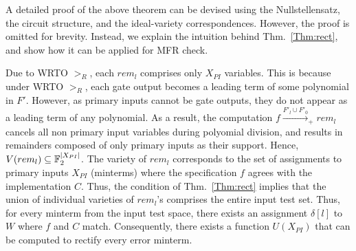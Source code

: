 
A detailed proof of the above theorem can be devised using the
Nullstellensatz, the circuit structure, and the 
ideal-variety correspondences. However, the proof is omitted for brevity. 
Instead, we explain the
intuition behind Thm.~\ref{Thm:rect}, and show how it can be applied
for MFR check.

Due to WRTO $>_R$, each $rem_l$ comprises only $X_{PI}$
variables. This is because under WRTO $>_R$, each gate output becomes
a leading term of some polynomial in $F'$. However, as primary inputs 
cannot be gate outputs, they do not appear as a leading term
of any polynomial. As a result, the computation
$f\xrightarrow{F'_l\cup F'_0}_+rem_l$ cancels all non primary input
variables during polyomial division, and results in remainders composed of 
only primary inputs as their support. Hence, $V(rem_l) \subseteq
{\mathbb{F}}_{2}^{|X_{PI}|}$. The variety of  $rem_l$  corresponds to the set of
assignments to primary inputs $X_{PI}$ (minterms) where the
specification $f$ agrees with the implementation $C$. Thus, the
condition of Thm.~\ref{Thm:rect} implies that the union of individual
varieties of $rem_l$'s comprises the entire input test set. Thus, for
every minterm from the input test space, there exists an assignment
$\delta[l]$ to $W$ where $f$ and $C$ match.  Consequently, there
exists a function $U(X_{PI})$ that can be computed to rectify every
error minterm.  


